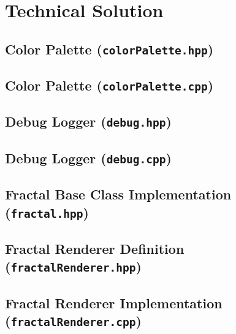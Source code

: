\section{Technical Solution}

\subsection{Color Palette (\texttt{colorPalette.hpp})}


\pagebreak

\subsection{Color Palette (\texttt{colorPalette.cpp})}


\pagebreak

\subsection{Debug Logger (\texttt{debug.hpp})}


\pagebreak

\subsection{Debug Logger (\texttt{debug.cpp})}


\pagebreak

\subsection{Fractal Base Class Implementation (\texttt{fractal.hpp})}


\pagebreak

\subsection{Fractal Renderer Definition (\texttt{fractalRenderer.hpp})}


\pagebreak

\subsection{Fractal Renderer Implementation (\texttt{fractalRenderer.cpp})}



